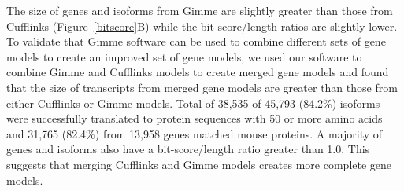 \documentclass[10pt]{article}
\begin{document}
The size of genes and isoforms from Gimme are slightly greater
than those from Cufflinks (Figure~\ref{bitscore}B) while the
bit-score/length ratios are slightly lower. To validate that
Gimme software can be used to combine different sets of gene
models to create an improved set of gene models, we used our
software to combine Gimme and Cufflinks models to create merged
gene models and found that the size of transcripts from merged
gene models are greater than those from either Cufflinks or Gimme
models.  Total of 38,535 of 45,793 (84.2\%) isoforms were
successfully translated to protein sequences with 50 or more
amino acids and 31,765 (82.4\%) from 13,958 genes matched mouse
proteins. A majority of genes and isoforms also have a
bit-score/length ratio greater than 1.0.  This suggests that
merging Cufflinks and Gimme models creates more complete gene
models.

\end{document}
